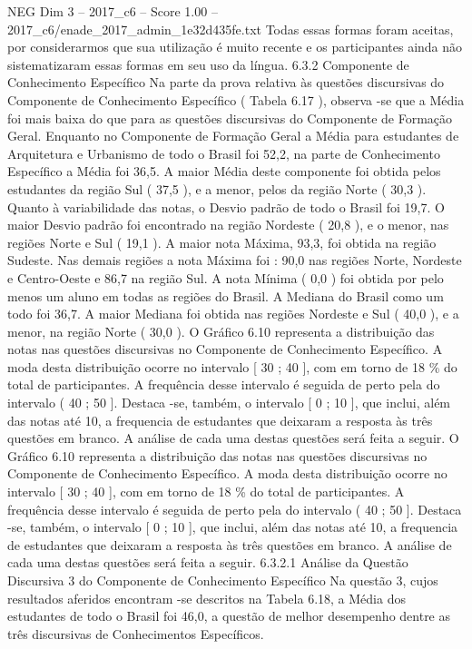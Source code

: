 \begin{textsample}{NEG Dim 3 – 2017\_c6 – Score 1.00 – 2017\_c6/enade\_2017\_admin\_1e32d435fe.txt}
Todas essas formas foram aceitas, por considerarmos que sua utilização é muito recente e os participantes ainda não sistematizaram essas formas em seu uso da língua. 6.3.2 Componente de Conhecimento Específico Na parte da prova relativa às questões discursivas do Componente de Conhecimento Específico ( Tabela 6.17 ), observa -se que a Média foi mais baixa do que para as questões discursivas do Componente de Formação Geral.
Enquanto no Componente de Formação Geral a Média para estudantes de Arquitetura e Urbanismo de todo o Brasil foi 52,2, na parte de Conhecimento Específico a Média foi 36,5.
A maior Média deste componente foi obtida pelos estudantes da região Sul ( 37,5 ), e a menor, pelos da região Norte ( 30,3 ).
Quanto à variabilidade das notas, o Desvio padrão de todo o Brasil foi 19,7.
O maior Desvio padrão foi encontrado na região Nordeste ( 20,8 ), e o menor, nas regiões Norte e Sul ( 19,1 ).
A maior nota Máxima, 93,3, foi obtida na região Sudeste.
Nas demais regiões a nota Máxima foi : 90,0 nas regiões Norte, Nordeste e Centro-Oeste e 86,7 na região Sul.
A nota Mínima ( 0,0 ) foi obtida por pelo menos um aluno em todas as regiões do Brasil.
A Mediana do Brasil como um todo foi 36,7.
A maior Mediana foi obtida nas regiões Nordeste e Sul ( 40,0 ), e a menor, na região Norte ( 30,0 ).
O Gráfico 6.10 representa a distribuição das notas nas questões discursivas no Componente de Conhecimento Específico.
A moda desta distribuição ocorre no intervalo [ 30 ; 40 ], com em torno de 18 \% do total de participantes.
A frequência desse intervalo é seguida de perto pela do intervalo ( 40 ; 50 ].
Destaca -se, também, o intervalo [ 0 ; 10 ], que inclui, além das notas até 10, a frequencia de estudantes que deixaram a resposta às três questões em branco.
A análise de cada uma destas questões será feita a seguir.
O Gráfico 6.10 representa a distribuição das notas nas questões discursivas no Componente de Conhecimento Específico.
A moda desta distribuição ocorre no intervalo [ 30 ; 40 ], com em torno de 18 \% do total de participantes.
A frequência desse intervalo é seguida de perto pela do intervalo ( 40 ; 50 ].
Destaca -se, também, o intervalo [ 0 ; 10 ], que inclui, além das notas até 10, a frequencia de estudantes que deixaram a resposta às três questões em branco.
A análise de cada uma destas questões será feita a seguir. 6.3.2.1 Análise da Questão Discursiva 3 do Componente de Conhecimento Específico Na questão 3, cujos resultados aferidos encontram -se descritos na Tabela 6.18, a Média dos estudantes de todo o Brasil foi 46,0, a questão de melhor desempenho dentre as três discursivas de Conhecimentos Específicos.

\end{textsample}
